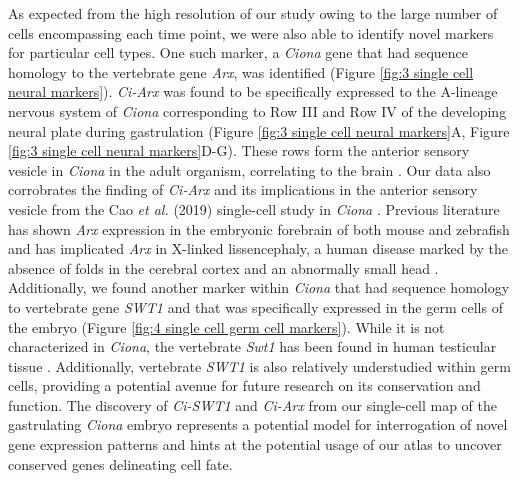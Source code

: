 As expected from the high resolution of our study owing to the large number of cells encompassing each time point, we were also able to identify novel markers for particular cell types. One such marker, a \textit{Ciona} gene that had sequence homology to the vertebrate gene \textit{Arx}, was identified (Figure \ref{fig:3 single cell neural markers}). \textit{Ci-Arx} was found to be specifically expressed to the A-lineage nervous system of \textit{Ciona} corresponding to Row III and Row IV of the developing neural plate during gastrulation (Figure \ref{fig:3 single cell neural markers}A, Figure \ref{fig:3 single cell neural markers}D-G). These rows form the anterior sensory vesicle in \textit{Ciona} in the adult organism, correlating to the brain \cite{satoh2014}. Our data also corrobrates the finding of \textit{Ci-Arx} and its implications in the anterior sensory vesicle from the Cao \textit{et al.} (2019) single-cell study in \textit{Ciona} \cite{cao2019}. Previous literature has shown \textit{Arx} expression in the embryonic forebrain of both mouse and zebrafish and has implicated \textit{Arx} in X-linked lissencephaly, a human disease marked by the absence of folds in the cerebral cortex and an abnormally small head \cite{miura1997,miura1997,kitamura2002,lim2019,fulp2008}. Additionally, we found another marker within \textit{Ciona} that had sequence homology to vertebrate gene \textit{SWT1} and that was specifically expressed in the germ cells of the embryo (Figure \ref{fig:4 single cell germ cell markers}). While it is not characterized in \textit{Ciona}, the vertebrate \textit{Swt1} has been found in human testicular tissue \cite{fagerberg2014}. Additionally, vertebrate \textit{SWT1} is also relatively understudied within germ cells, providing a potential avenue for future research on its conservation and function. The discovery of \textit{Ci-SWT1} and \textit{Ci-Arx} from our single-cell map of the gastrulating \textit{Ciona} embryo represents a potential model for interrogation of novel gene expression patterns and hints at the potential usage of our atlas to uncover conserved genes delineating cell fate.


